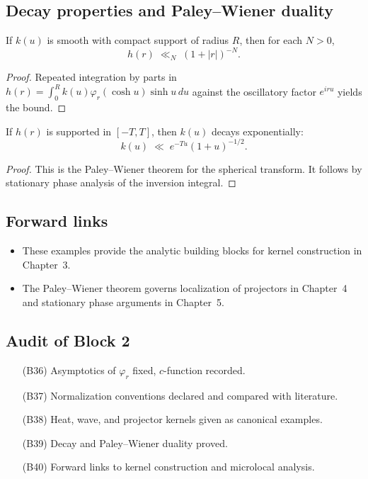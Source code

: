 \subsection{Decay properties and Paley--Wiener duality}

\begin{lemma}
If $k(u)$ is smooth with compact support of radius $R$,
then for each $N>0$,
\[
  h(r) \;\ll_N\; (1+|r|)^{-N}.
\]
\end{lemma}

\begin{proof}
Repeated integration by parts in
$h(r)=\int_0^R k(u)\varphi_r(\cosh u)\sinh u\,du$
against the oscillatory factor $e^{iru}$ yields the bound.
\end{proof}

\begin{lemma}
If $h(r)$ is supported in $[-T,T]$,
then $k(u)$ decays exponentially:
\[
  k(u) \;\ll\; e^{-Tu}(1+u)^{-1/2}.
\]
\end{lemma}

\begin{proof}
This is the Paley--Wiener theorem for the spherical transform.
It follows by stationary phase analysis of the inversion integral.
\end{proof}

\subsection*{Forward links}

\begin{itemize}
  \item These examples provide the analytic building blocks
        for kernel construction in Chapter~3.
  \item The Paley--Wiener theorem governs localization of projectors
        in Chapter~4 and stationary phase arguments in Chapter~5.
\end{itemize}

\subsection*{Audit of Block 2}

\begin{itemize}
  \item[(B36)] Asymptotics of $\varphi_r$ fixed, $c$-function recorded.
  \item[(B37)] Normalization conventions declared and compared with literature.
  \item[(B38)] Heat, wave, and projector kernels given as canonical examples.
  \item[(B39)] Decay and Paley--Wiener duality proved.
  \item[(B40)] Forward links to kernel construction and microlocal analysis.
\end{itemize}

